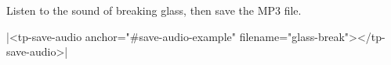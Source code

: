 \documentclass{article}
\begin{document}
Listen to the sound of breaking glass, then save the MP3 file.


\wcAudio[id=save-audio-example,controls,preload=metadata,aria-label=Sound of breaking glass]{
  \wcSource[src=/docs/medias/audios/glass-break.mp3,type=audio/mpeg]{}
}

\rawhtml|<tp-save-audio anchor="#save-audio-example" filename="glass-break"></tp-save-audio>|
\end{document}
